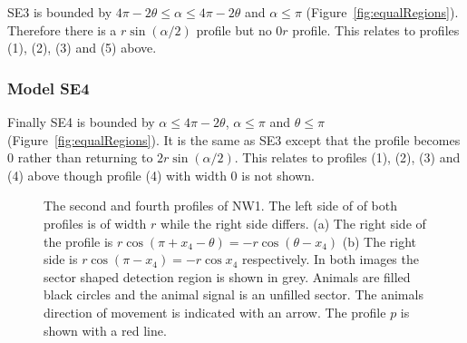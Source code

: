 SE3 is bounded by $4\pi - 2\theta \le \alpha \le 4\pi - 2\theta$ and $\alpha \le \pi$ (Figure~\ref{fig:equalRegions}).
Therefore there is a $r\sin(\alpha/2)$ profile but no $0r$ profile.
This relates to profiles (1), (2), (3) and (5) above.



\subsubsection{Model SE4} \label{SE4}

Finally SE4 is bounded by  $\alpha \le 4\pi - 2\theta $, $\alpha\le\pi$ and $\theta \le \pi$ (Figure~\ref{fig:equalRegions}).
It is the same as SE3 except that the profile becomes 0 rather than returning to $2r\sin(\alpha/2)$.
This relates to profiles (1), (2), (3) and (4) above though profile (4) with width 0 is not shown.




\begin{figure}[t]
  \centering
{
}
\caption[The second and fourth profiles of NW1]{
The second and fourth profiles of NW1.
The left side of of both profiles is of width $r$ while the right side differs.
(a) The right side of the profile is $r\cos(\pi+x_4-\theta) = - r\cos(\theta - x_4 )$ 
(b) The right side is $r\cos(\pi-x_4) = - r\cos x_4$ respectively.
In both images the sector shaped detection region is shown in grey.
Animals are filled black circles and the animal signal is an unfilled sector.
The animals direction of movement is indicated with an arrow.
The profile $p$ is shown with a red line.
}
\label{fig:NW1}
\end{figure}


